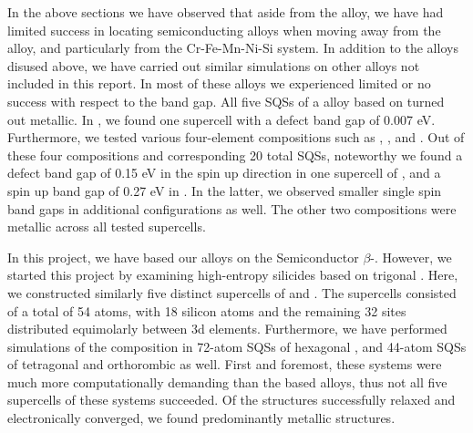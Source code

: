In the above sections we have observed that aside from the  alloy, we have had limited success in locating semiconducting alloys when moving away from the  alloy, and particularly from the Cr-Fe-Mn-Ni-Si system. In addition to the alloys disused above, we have carried out similar simulations on other alloys not included in this report. In most of these alloys we experienced limited or no success with respect to the band gap. All five SQSs of a  alloy based on  turned out metallic. In , we found one supercell with a defect band gap of 0.007 eV. Furthermore, we tested various four-element compositions such as , ,  and . Out of these four compositions and corresponding 20 total SQSs, noteworthy we found a defect band gap of 0.15 eV in the spin up direction in one supercell of , and a spin up band gap of 0.27 eV in . In the latter, we observed smaller single spin band gaps in additional configurations as well. The other two compositions were metallic across all tested supercells.    

In this project, we have based our alloys on the Semiconductor $\beta$-. However, we started this project by examining high-entropy silicides based on trigonal . Here, we constructed similarly five distinct supercells of  and . The supercells consisted of a total of 54 atoms, with 18 silicon atoms and the remaining 32 sites distributed equimolarly between 3d elements. Furthermore, we have performed simulations of the  composition in 72-atom SQSs of hexagonal , and 44-atom SQSs of tetragonal and orthorombic  as well. First and foremost, these systems were much more computationally demanding than the  based alloys, thus not all five supercells of these systems succeeded. Of the structures successfully relaxed and electronically converged, we found predominantly metallic structures.

  
